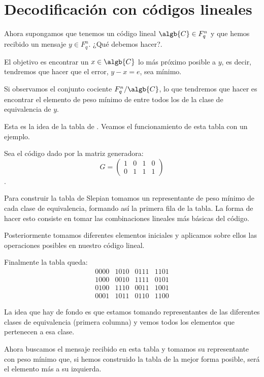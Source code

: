 \section{Decodificación con códigos lineales}
Ahora supongamos que tenemos un código lineal $\algb{C} \in F_q^n$ y que hemos recibido un mensaje $y \in F_q^n$. ¿Qué debemos hacer?.

El objetivo es encontrar un $x \in \algb{C}$ lo más próximo posible a $y$, es decir, tendremos que hacer que el error, $y-x=e$, sea mínimo.

Si observamos el conjunto cociente $F_q^n/\algb{C}$, lo que tendremos que hacer es encontrar el elemento de peso mínimo de entre todos los de la clase de equivalencia de $y$.

Esta es la idea de la tabla de . Veamos el funcionamiento de esta tabla con un ejemplo.

\begin{example}
Sea el código dado por la matriz generadora:
\[G = \left( \begin{array}{cccc} 1 & 0 & 1 & 0 \\ 0 & 1 & 1 & 1 \end{array}\right)\].

Para construir la tabla de Slepian tomamos un representante de peso mínimo de cada clase de equivalencia, formando así la primera fila de la tabla. La forma de hacer esto consiste en tomar las combinaciones lineales más básicas del código.

Posteriormente tomamos diferentes elementos iniciales y aplicamos sobre ellos las operaciones posibles en nuestro código lineal.

Finalmente la tabla queda:
\[\begin{array}{cccc}
0000 & 1010 & 0111 & 1101 \\
1000 & 0010 & 1111 & 0101 \\
0100 & 1110 & 0011 & 1001 \\
0001 & 1011 & 0110 & 1100
\end{array}\]


La idea que hay de fondo es que estamos tomando representantes de las diferentes clases de equivalencia (primera columna) y vemos todos los elementos que pertenecen a esa clase.

Ahora buscamos el mensaje recibido en esta tabla y tomamos su representante con peso mínimo que, si hemos construido la tabla de la mejor forma posible, será el elemento más a su izquierda.
\end{example}